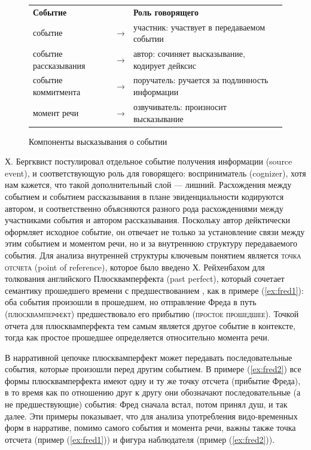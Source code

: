 \begin{figure}[h]
\centering
\caption{Компоненты высказывания о событии}
\label{fig:roles}
\vspace{0.5cm}

\begin{tabular}{lll}
\textbf{Событие}      & \textbf{} & \textbf{Роль говорящего}                       \\
событие               & →         & участник: участвует в передаваемом событии     \\
событие рассказывания & →         & автор: сочиняет высказывание, кодирует дейксис \\
событие коммитмента   & →         & поручатель: ручается за подлинность информации             \\
момент речи           & →         & озвучиватель: произносит высказывание                       
\end{tabular}
\end{figure}

Х. Бергквист постулировал отдельное событие получения информации (source event), и соответствующую роль для говорящего: восприниматель (cognizer), хотя нам кажется, что такой дополнительный слой --- лишний. Расхождения между событием и событием рассказывания в плане эвиденциальности кодируются автором, и соответственно объясняются разного рода расхождениями между участниками события и автором рассказывания. Поскольку автор дейктически оформляет исходное событие, он отвечает не только за установление связи между этим событием и моментом речи, но и за внутреннюю структуру передаваемого события. Для анализа внутренней структуры ключевым понятием является \textsc{точка отсчета} (point of reference), которое было введено Х. Рейхенбахом для толкования английского Плюсквамперфекта (past perfect), который сочетает семантику прошедшего времени с предшествованием \citep{reichenbach1947}, как в примере (\ref{ex:fred1}): оба события произошли в прошедшем, но отправление Фреда в путь (\textsc{плюсквамперфект}) предшествовало его прибытию (\textsc{простое прошедшее}). Точкой отчета для плюсквамперфекта тем самым является другое событие в контексте, тогда как простое прошедшее определяется относительно момента речи.


В нарративной цепочке плюсквамперфект может передавать последовательные события, которые произошли перед другим событием. В примере (\ref{ex:fred2}) все формы плюсквамперфекта имеют одну и ту же точку отсчета (прибытие Фреда), в то время как по отношению друг к другу они обозначают последовательные (а не предшествующие) события: Фред сначала встал, потом принял душ, и так далее. Эти примеры показывает, что для анализа употребления видо-временных форм в нарративе, помимо самого события и момента речи, важны также точка отсчета (пример (\ref{ex:fred1})) и фигура наблюдателя (пример (\ref{ex:fred2})).

